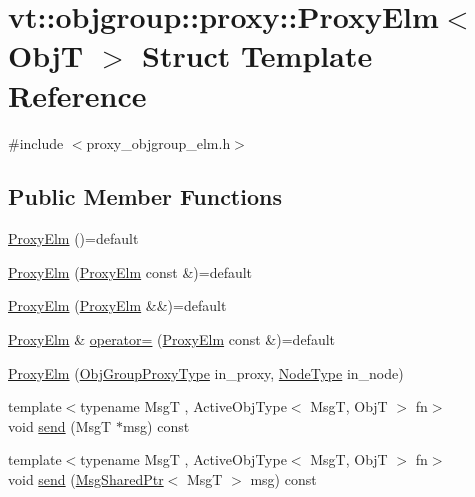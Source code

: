 \hypertarget{structvt_1_1objgroup_1_1proxy_1_1_proxy_elm}{}\section{vt\+:\+:objgroup\+:\+:proxy\+:\+:Proxy\+Elm$<$ ObjT $>$ Struct Template Reference}
\label{structvt_1_1objgroup_1_1proxy_1_1_proxy_elm}


{\ttfamily \#include $<$proxy\+\_\+objgroup\+\_\+elm.\+h$>$}

\subsection*{Public Member Functions}
\begin{DoxyCompactItemize}
\item 
\hyperlink{structvt_1_1objgroup_1_1proxy_1_1_proxy_elm_ad610547c98659b9d34a6dca416a4d319}{Proxy\+Elm} ()=default
\item 
\hyperlink{structvt_1_1objgroup_1_1proxy_1_1_proxy_elm_a50590ebf12e4ae89fc140583412d05b0}{Proxy\+Elm} (\hyperlink{structvt_1_1objgroup_1_1proxy_1_1_proxy_elm}{Proxy\+Elm} const \&)=default
\item 
\hyperlink{structvt_1_1objgroup_1_1proxy_1_1_proxy_elm_aa3feddfc8142ae38f9436ce3ff86efb7}{Proxy\+Elm} (\hyperlink{structvt_1_1objgroup_1_1proxy_1_1_proxy_elm}{Proxy\+Elm} \&\&)=default
\item 
\hyperlink{structvt_1_1objgroup_1_1proxy_1_1_proxy_elm}{Proxy\+Elm} \& \hyperlink{structvt_1_1objgroup_1_1proxy_1_1_proxy_elm_a9211613f646a4f3d215cf1d9e76219db}{operator=} (\hyperlink{structvt_1_1objgroup_1_1proxy_1_1_proxy_elm}{Proxy\+Elm} const \&)=default
\item 
\hyperlink{structvt_1_1objgroup_1_1proxy_1_1_proxy_elm_a59a010b3f1428a77cb12a9806028f399}{Proxy\+Elm} (\hyperlink{namespacevt_ad7cae989df485fccca57f0792a880a8e}{Obj\+Group\+Proxy\+Type} in\+\_\+proxy, \hyperlink{namespacevt_a866da9d0efc19c0a1ce79e9e492f47e2}{Node\+Type} in\+\_\+node)
\item 
{\footnotesize template$<$typename MsgT , Active\+Obj\+Type$<$ Msg\+T, Obj\+T $>$ fn$>$ }\\void \hyperlink{structvt_1_1objgroup_1_1proxy_1_1_proxy_elm_a64d85f6d2721f2001e1e9ecb910e34f9}{send} (MsgT $\ast$msg) const
\item 
{\footnotesize template$<$typename MsgT , Active\+Obj\+Type$<$ Msg\+T, Obj\+T $>$ fn$>$ }\\void \hyperlink{structvt_1_1objgroup_1_1proxy_1_1_proxy_elm_ab3d1751dac7c003cd13306277c164247}{send} (\hyperlink{namespacevt_ab2b3d506ec8e8d1540aede826d84a239}{Msg\+Shared\+Ptr}$<$ MsgT $>$ msg) const

\end{DoxyCompactItemize}
